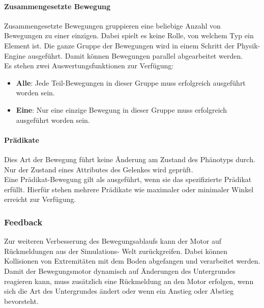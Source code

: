       \paragraph{Zusammengesetzte Bewegung\label{EngineMovementsCompound}}

        Zusammengesetzte Bewegungen gruppieren eine beliebige Anzahl von Bewegungen zu einer einzigen.
        Dabei spielt es keine Rolle, von welchem Typ ein Element ist.
        Die ganze Gruppe der Bewegungen wird in einem Schritt der Physik-Engine ausgeführt.
        Damit können Bewegungen parallel abgearbeitet werden.
        \\
        Es stehen zwei Auswertungsfunktionen zur Verfügung:
        \begin{itemize}
          \item \textbf{Alle}: Jede Teil-Bewegungen in dieser Gruppe muss erfolgreich ausgeführt worden sein.
          \item \textbf{Eine}: Nur eine einzige Bewegung in dieser Gruppe muss erfolgreich ausgeführt worden sein.
        \end{itemize}

      \paragraph{Prädikate\label{EngineMovementsPredicates}}

        Dies Art der Bewegung führt keine Änderung am Zustand des Phänotyps durch.
        Nur der Zustand eines Attributes des Gelenkes wird geprüft.
        \\
        Eine Prädikat-Bewegung gilt als ausgeführt, wenn sie das spezifizierte Prädikat erfüllt.
        Hierfür stehen mehrere Prädikate wie maximaler oder minimaler Winkel erreicht zur Verfügung.

    \subsubsection{Feedback}

      Zur weiteren Verbesserung des Bewegungsablaufs kann der Motor auf Rückmeldungen aus der Simulations-
      Welt zurückgreifen.
      Dabei können Kollisionen von Extremitäten mit dem Boden abgefangen und verarbeitet werden.
      \\
      Damit der Bewegungsmotor dynamisch auf Änderungen des Untergrundes reagieren kann,
      muss zusätzlich eine Rückmeldung an den Motor erfolgen, wenn sich die Art des Untergrundes ändert
      oder wenn ein Anstieg oder Abstieg bevorsteht.
      \\

